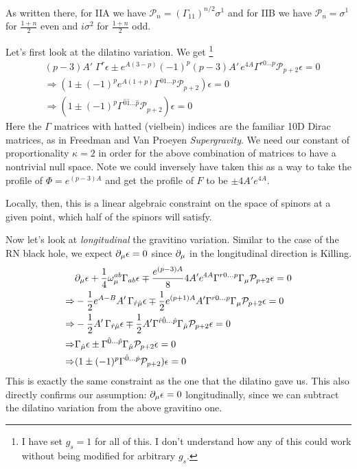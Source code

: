 \documentclass[11pt, class=article, crop=false]{standalone}
\begin{document}
\begin{enumerate}
	 As written there, for IIA we have $\mathcal P_n = (\Gamma_{11})^{n/2} \sigma^1$ and for IIB we have $\mathcal P_n = \sigma^1$ for $\frac{1+n}{2}$ even and $i \sigma^2$ for $\frac{1+n}{2}$ odd. 
	
	Let's first look at the dilatino variation. We get \footnote{I have set $g_s = 1$ for all of this. I don't understand how any of this could work without being modified for arbitrary $g_s$.}
	\[
	\begin{aligned}
		&(p-3) A' \; \Gamma^r \epsilon \pm e^{A(3-p)} (-1)^{p} (p-3) A'\, e^{4A} \Gamma^{r 0 \dots p} \mathcal P_{p+2} \epsilon = 0\\
		& \Rightarrow (1 \pm (-1)^{p} e^{A (1 + p)} \Gamma^{0 1 \dots p} \mathcal P_{p+2}) \epsilon = 0\\
		& \Rightarrow (1 \pm  (-1)^{p} \Gamma^{\hat 0 \hat 1 \dots \hat p} \mathcal P_{p+2}) \epsilon = 0
	\end{aligned}
	\]
	Here the $\Gamma$ matrices with hatted (vielbein) indices are the familiar 10D Dirac matrices, as in Freedman and Van Proeyen \emph{Supergravity}. We need our constant of proportionality $\kappa=2$ in order for the above combination of matrices to have a nontrivial null space. Note we could inversely have taken this as a way to take the profile of $\Phi = e^{(p-3) A}$ and get the profile of $F$ to be  $\pm 4 A' e^{4A}$.

	Locally, then, this is a linear algebraic constraint on the space of spinors at a given point, which half of the spinors will satisfy. 
	
	Now let's look at \emph{longitudinal} the gravitino variation. Similar to the case of the RN black hole, we expect $\partial_\mu \epsilon = 0$ since $\partial_\mu$ in the longitudinal direction is Killing.
	\[
	\begin{aligned}
		& \partial_\mu \epsilon + \frac14 \omega_\mu^{ab} \Gamma_{ab} \epsilon \mp \frac{e^{(p-3)A}}{8} 4 A' e^{4 A} \Gamma^{r 0 \dots p} \Gamma_\mu \mathcal P_{p+2} \epsilon = 0 \\
		\Rightarrow & - \frac12 e^{A-B} A' \, \Gamma_{\hat r \hat \mu} \epsilon \mp \frac12 e^{(p+1)A} A' \Gamma^{r 0 \dots p} \Gamma_\mu \mathcal P_{p+2} \epsilon = 0\\
		\Rightarrow & - \frac12 A' \, \Gamma_{\hat r \hat \mu} \epsilon \mp \frac12 A' \Gamma^{\hat r \hat 0 \dots \hat p} \Gamma_{\hat \mu} \mathcal P_{p+2} \epsilon = 0\\
		\Rightarrow & \Gamma_{\hat \mu} \epsilon \pm \Gamma^{\hat 0 \dots \hat p} \Gamma_{\hat \mu} \mathcal P_{p+2} \epsilon = 0\\
		\Rightarrow & (1 \pm (-1)^p \Gamma^{\hat 0 \dots \hat p} \mathcal P_{p+2}) \epsilon = 0
	\end{aligned}
	\]
	This is exactly the same constraint as the one that the dilatino gave us. This also directly confirms our assumption: $\partial_\mu \epsilon = 0$ longitudinally, since we can subtract the dilatino variation from the above gravitino one. 
	

\end{enumerate}
\end{document}
